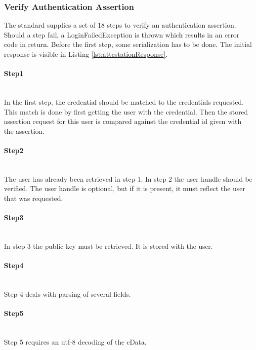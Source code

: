 \documentclass[a4paper, 11pt]{scrartcl}
\begin{document}
\subsubsection{Verify Authentication Assertion}

The standard supplies a set of 18 steps to verify an authentication assertion. Should a step fail, a LoginFailedException is thrown which results in an error code in return. Before the first step, some serialization has to be done. The initial response is visible in Listing \ref{lst:attestationResponse}.



\paragraph{Step1}\hfill \\ 
In the first step, the credential should be matched to the credentials requested. This match is done by first getting the user with the credential. Then the stored assertion request for this user is compared against the credential id given with the assertion.

\paragraph{Step2}\hfill \\ 
The user has already been retrieved in step 1. In step 2 the user handle should be verified. The user handle is optional, but if it is present, it must reflect the user that was requested.

\paragraph{Step3}\hfill \\ 
In step 3 the public key must be retrieved. It is stored with the user.

\paragraph{Step4}\hfill \\ 
Step 4 deals with parsing of several fields. 

\paragraph{Step5}\hfill \\ 
Step 5 requires an \gls{utf-8} decoding of the cData.
\end{document}
